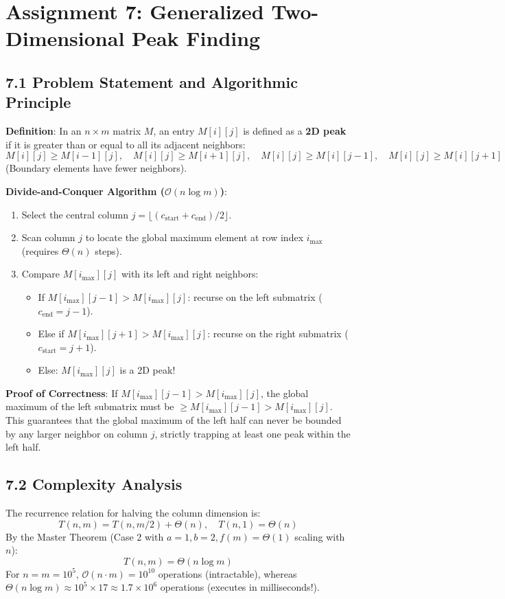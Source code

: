 \documentclass[12pt]{article}
\begin{document}
\section*{Assignment 7: Generalized Two-Dimensional Peak Finding}

\subsection*{7.1 Problem Statement and Algorithmic Principle}
\textbf{Definition}: In an $n \times m$ matrix $M$, an entry $M[i][j]$ is defined as a \textbf{2D peak} if it is greater than or equal to all its adjacent neighbors:
\[
M[i][j] \ge M[i-1][j], \quad M[i][j] \ge M[i+1][j], \quad M[i][j] \ge M[i][j-1], \quad M[i][j] \ge M[i][j+1]
\]
(Boundary elements have fewer neighbors).

\textbf{Divide-and-Conquer Algorithm ($\mathcal{O}(n \log m)$)}:
\begin{enumerate}
    \item Select the central column $j = \lfloor(c_{\text{start}} + c_{\text{end}}) / 2\rfloor$.
    \item Scan column $j$ to locate the global maximum element at row index $i_{\max}$ (requires $\Theta(n)$ steps).
    \item Compare $M[i_{\max}][j]$ with its left and right neighbors:
    \begin{itemize}
        \item If $M[i_{\max}][j-1] > M[i_{\max}][j]$: recurse on the left submatrix ($c_{\text{end}} = j - 1$).
        \item Else if $M[i_{\max}][j+1] > M[i_{\max}][j]$: recurse on the right submatrix ($c_{\text{start}} = j + 1$).
        \item Else: $M[i_{\max}][j]$ is a 2D peak!
    \end{itemize}
\end{enumerate}

\textbf{Proof of Correctness}:
If $M[i_{\max}][j-1] > M[i_{\max}][j]$, the global maximum of the left submatrix must be $\ge M[i_{\max}][j-1] > M[i_{\max}][j]$. This guarantees that the global maximum of the left half can never be bounded by any larger neighbor on column $j$, strictly trapping at least one peak within the left half.

\subsection*{7.2 Complexity Analysis}
The recurrence relation for halving the column dimension is:
\[
T(n, m) = T(n, m/2) + \Theta(n), \quad T(n, 1) = \Theta(n)
\]
By the Master Theorem (Case 2 with $a=1, b=2, f(m)=\Theta(1)$ scaling with $n$):
\[
T(n, m) = \Theta(n \log m)
\]
For $n = m = 10^5$, $\mathcal{O}(n \cdot m) = 10^{10}$ operations (intractable), whereas $\Theta(n \log m) \approx 10^5 \times 17 \approx 1.7 \times 10^6$ operations (executes in milliseconds!).
\end{document}
